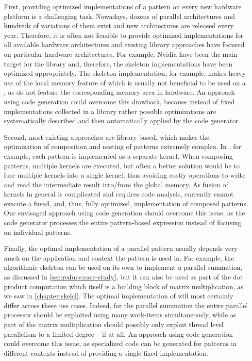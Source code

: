 First, providing optimized implementations of a pattern on every new hardware platform is a challenging task.
Nowadays, dozens of parallel architectures and hundreds of variations of them exist and new architectures are released every year.
Therefore, it is often not feasible to provide optimized implementations for all available hardware architectures and existing library approaches have focused on particular hardware architectures.
For example, Nvidia \GPUs have been the main target for the \SkelCL library and, therefore, the skeleton implementations have been optimized appropriately.
The \stencil skeleton implementation, for example, makes heavy use of the local memory feature of \OpenCL which is usually not beneficial to be used on a \CPU, as \CPUs do not feature the corresponding memory area in hardware.
An approach using code generation could overcome this drawback, because instead of fixed implementations collected in a library rather possible optimizations are systematically described and then automatically applied by the code generator.

\bigskip

Second, most existing approaches are library-based, which makes the optimization of composition and nesting of patterns extremely complex.
In \SkelCL, for example, each pattern is implemented as a separate \OpenCL kernel.
When composing patterns, multiple kernels are executed, but often a better solution would be to fuse multiple kernels into a single kernel, thus avoiding costly operations to write and read the intermediate result into/from the global memory.
As fusion of \OpenCL kernels in general is complicated and requires code analysis, \SkelCL currently cannot execute a fused, and, thus, fully optimized, implementation of composed patterns.
Our envisaged approach using code generation should overcome this issue, as the code generator processes the entire pattern-based expression instead of focusing on individual patterns.

\bigskip

Finally, the optimal implementation of a parallel pattern usually depends very much on the application and context the pattern is used in.
For example, the algorithmic skeleton \reduce can be used on its own to implement a parallel summation, as discussed in \autoref{sec:reduce:case-study}, but it can also be used as part of the dot product computation which itself is a building block of matrix multiplication, as we saw in \autoref{chapter:skelcl}.
The optimal implementation of \reduce will most certainly differ across these use cases.
Indeed, for the parallel summation the entire parallel processor should be exploited using many \OpenCL work-items simultaneously, while as part of the matrix multiplication \reduce should possibly only exploit thread level parallelism to a limited degree -- if at all.
An approach using code generation could overcome this issue, as specialized code can be generated for patterns in different contexts instead of providing a single fixed implementation.

